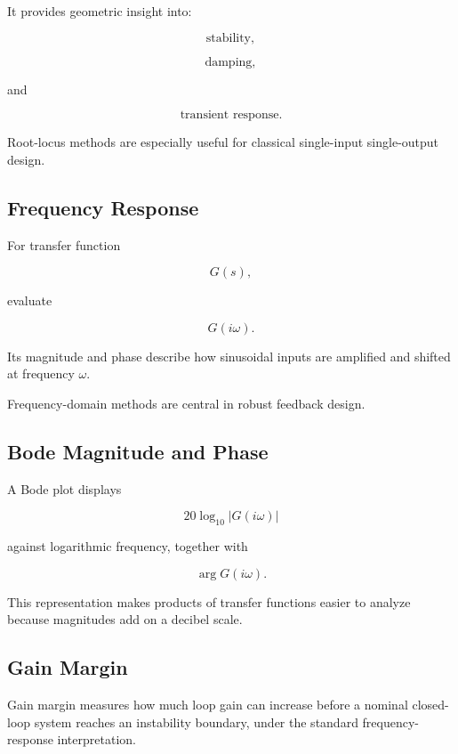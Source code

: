 It provides geometric insight into:

\[
\boxed{
\text{stability},
}
\]

\[
\boxed{
\text{damping},
}
\]

and

\[
\boxed{
\text{transient response}.
}
\]

Root-locus methods are especially useful for classical single-input
single-output design.

\subsection{Frequency Response}
\label{subsec:control-frequency-response}

For transfer function

\[
G(s),
\]

evaluate

\[
\boxed{
G(i\omega).
}
\]

Its magnitude and phase describe how sinusoidal inputs are amplified and
shifted at frequency \(\omega\).

Frequency-domain methods are central in robust feedback design.

\subsection{Bode Magnitude and Phase}
\label{subsec:bode-plots}

A Bode plot displays

\[
\boxed{
20\log_{10}|G(i\omega)|
}
\]

against logarithmic frequency, together with

\[
\boxed{
\arg G(i\omega).
}
\]

This representation makes products of transfer functions easier to analyze
because magnitudes add on a decibel scale.

\subsection{Gain Margin}
\label{subsec:gain-margin}

Gain margin measures how much loop gain can increase before a nominal
closed-loop system reaches an instability boundary, under the standard
frequency-response interpretation.

